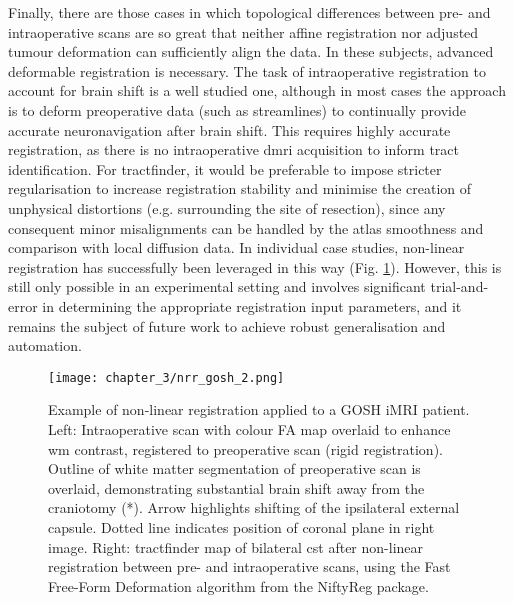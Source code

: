 Finally, there are those cases in which topological differences between pre- and intraoperative scans are so great that neither affine registration nor adjusted tumour deformation can sufficiently align the data.
In these subjects, advanced deformable registration is necessary.
The task of intraoperative registration to account for brain shift is a well studied one, although in most cases the approach is to deform preoperative data (such as streamlines) to continually provide accurate neuronavigation after brain shift.\autocite{Clatz2005,Archip2007,Wittek2007,Archip2008}
This requires highly accurate registration, as there is no intraoperative \gls{dmri} acquisition to inform tract identification.
For tractfinder, it would be preferable to impose stricter regularisation to increase registration stability and minimise the creation of unphysical distortions (e.g. surrounding the site of resection), since any consequent minor misalignments can be handled by the atlas smoothness and comparison with local diffusion data.
In individual case studies, non-linear registration has successfully been leveraged in this way (Fig. \ref{fig:nrrex}).
However, this is still only possible in an experimental setting and involves significant trial-and-error in determining the appropriate registration input parameters, and it remains the subject of future work to achieve robust generalisation and automation.

\begin{figure}[hb!]
  \centering
  \texttt{[image: chapter\_3/nrr\_gosh\_2.png]}
  \caption{Example of non-linear registration applied to a GOSH iMRI patient. Left: Intraoperative scan with colour FA map overlaid to enhance \gls{wm} contrast, registered to preoperative scan (rigid registration). Outline of white matter segmentation of preoperative scan is overlaid, demonstrating substantial brain shift away from the craniotomy (*). Arrow highlights shifting of the ipsilateral external capsule. Dotted line indicates position of coronal plane in right image. Right: tractfinder map of bilateral \gls{cst} after non-linear registration between pre- and intraoperative scans, using the Fast Free-Form Deformation algorithm from the NiftyReg package.}
  \label{fig:nrrex}
\end{figure}
